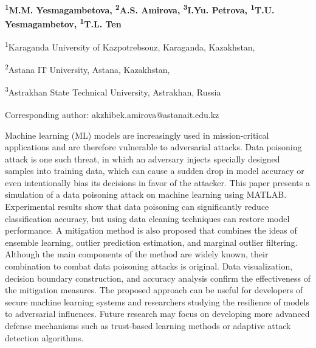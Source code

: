 
\begin{articleheader}

{\bfseries
\textsuperscript{1}M.M. Yesmagambetova,
\textsuperscript{2}A.S. Amirova\textsuperscript{\envelope },
\textsuperscript{3}I.Yu. Petrova,
\textsuperscript{1}T.U. Yesmagambetov,
\textsuperscript{1}T.L. Ten
}
\end{articleheader}

\begin{affiliation}
\textsuperscript{1}Karaganda University of Kazpotrebsouz, Karaganda, Kazakhstan,

\textsuperscript{2}Astana IT University, Astana, Kazakhstan,

\textsuperscript{3}Astrakhan State Technical University, Astrakhan, Russia

\raggedright \textsuperscript{\envelope }Corresponding author: akzhibek.amirova@astanait.edu.kz
\end{affiliation}

Machine learning (ML) models are increasingly used in mission-critical
applications and are therefore vulnerable to adversarial attacks. Data
poisoning attack is one such threat, in which an adversary injects
specially designed samples into training data, which can cause a sudden
drop in model accuracy or even intentionally bias its decisions in favor
of the attacker. This paper presents a simulation of a data poisoning
attack on machine learning using MATLAB. Experimental results show that
data poisoning can significantly reduce classification accuracy, but
using data cleaning techniques can restore model performance. A
mitigation method is also proposed that combines the ideas of ensemble
learning, outlier prediction estimation, and marginal outlier filtering.
Although the main components of the method are widely known, their
combination to combat data poisoning attacks is original. Data
visualization, decision boundary construction, and accuracy analysis
confirm the effectiveness of the mitigation measures. The proposed
approach can be useful for developers of secure machine learning systems
and researchers studying the resilience of models to adversarial
influences. Future research may focus on developing more advanced
defense mechanisms such as trust-based learning methods or adaptive
attack detection algorithms.

